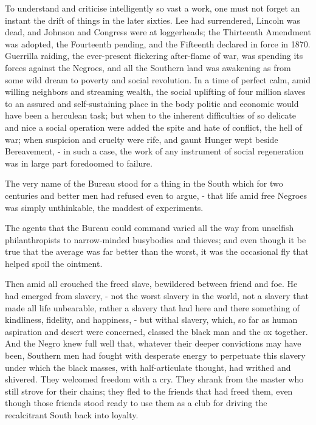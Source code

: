 To understand and criticise intelligently so vast a work, one must not forget an instant the drift of things in the later sixties. Lee had surrendered, Lincoln was dead, and Johnson and Congress were at loggerheads; the Thirteenth Amendment was adopted, the Fourteenth pending, and the Fifteenth declared in force in 1870. Guerrilla raiding, the ever-present flickering after-flame of war, was spending its forces against the Negroes, and all the Southern land was awakening as from some wild dream to poverty and social revolution. In a time of perfect calm, amid willing neighbors and streaming wealth, the social uplifting of four million slaves to an assured and self-sustaining place in the body politic and economic would have been a herculean task; but when to the inherent difficulties of so delicate and nice a social operation were added the spite and hate of conflict, the hell of war; when suspicion and cruelty were rife, and gaunt Hunger wept beside Bereavement, - in such a case, the work of any instrument of social regeneration was in large part foredoomed to failure.\par

The very name of the Bureau stood for a thing in the South which for two centuries and better men had refused even to argue, - that life amid free Negroes was simply unthinkable, the maddest of experiments.\par

The agents that the Bureau could command varied all the way from unselfish philanthropists to narrow-minded busybodies and thieves; and even though it be true that the average was far better than the worst, it was the occasional fly that helped spoil the ointment.\par

Then amid all crouched the freed slave, bewildered between friend and foe. He had emerged from slavery, - not the worst slavery in the world, not a slavery that made all life unbearable, rather a slavery that had here and there something of kindliness, fidelity, and happiness, - but withal slavery, which, so far as human aspiration and desert were concerned, classed the black man and the ox together. And the Negro knew full well that, whatever their deeper convictions may have been, Southern men had fought with desperate energy to perpetuate this slavery under which the black masses, with half-articulate thought, had writhed and shivered. They welcomed freedom with a cry. They shrank from the master who still strove for their chains; they fled to the friends that had freed them, even though those friends stood ready to use them as a club for driving the recalcitrant South back into loyalty.\par

